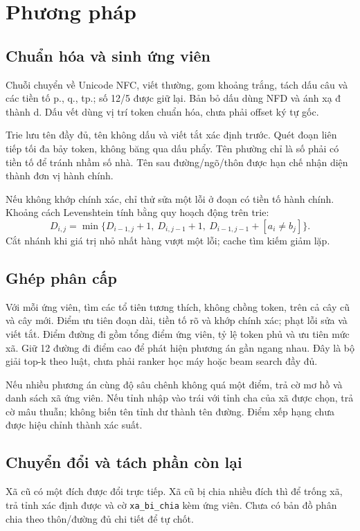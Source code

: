 \documentclass[12pt,a4paper]{article}
\begin{document}
\section{Phương pháp}
\subsection{Chuẩn hóa và sinh ứng viên}
Chuỗi chuyển về Unicode NFC, viết thường, gom khoảng trắng, tách dấu câu và các tiền tố p., q., tp.; số 12/5 được giữ lại. Bản bỏ dấu dùng NFD và ánh xạ đ thành d. Dấu vết dùng vị trí token chuẩn hóa, chưa phải offset ký tự gốc.

Trie lưu tên đầy đủ, tên không dấu và viết tắt xác định trước. Quét đoạn liên tiếp tối đa bảy token, không băng qua dấu phẩy. Tên phường chỉ là số phải có tiền tố để tránh nhầm số nhà. Tên sau đường/ngõ/thôn được hạn chế nhận diện thành đơn vị hành chính.

Nếu không khớp chính xác, chỉ thử sửa một lỗi ở đoạn có tiền tố hành chính. Khoảng cách Levenshtein tính bằng quy hoạch động trên trie:
\[
D_{i,j}=\min\{D_{i-1,j}+1,\ D_{i,j-1}+1,\ D_{i-1,j-1}+[a_i\ne b_j]\}.
\]
Cắt nhánh khi giá trị nhỏ nhất hàng vượt một lỗi; cache tìm kiếm giảm lặp.

\subsection{Ghép phân cấp}
Với mỗi ứng viên, tìm các tổ tiên tương thích, không chồng token, trên cả cây cũ và cây mới. Điểm ưu tiên đoạn dài, tiền tố rõ và khớp chính xác; phạt lỗi sửa và viết tắt. Điểm đường đi gồm tổng điểm ứng viên, tỷ lệ token phủ và ưu tiên mức xã. Giữ 12 đường đi điểm cao để phát hiện phương án gần ngang nhau. Đây là bộ giải top-k theo luật, chưa phải ranker học máy hoặc beam search đầy đủ.

Nếu nhiều phương án cùng độ sâu chênh không quá một điểm, trả cờ mơ hồ và danh sách xã ứng viên. Nếu tỉnh nhập vào trái với tỉnh cha của xã được chọn, trả cờ mâu thuẫn; không biến tên tỉnh dư thành tên đường. Điểm xếp hạng chưa được hiệu chỉnh thành xác suất.

\subsection{Chuyển đổi và tách phần còn lại}
Xã cũ có một đích được đổi trực tiếp. Xã cũ bị chia nhiều đích thì để trống xã, trả tỉnh xác định được và cờ \texttt{xa\_bi\_chia} kèm ứng viên. Chưa có bản đồ phân chia theo thôn/đường đủ chi tiết để tự chốt.
\end{document}
